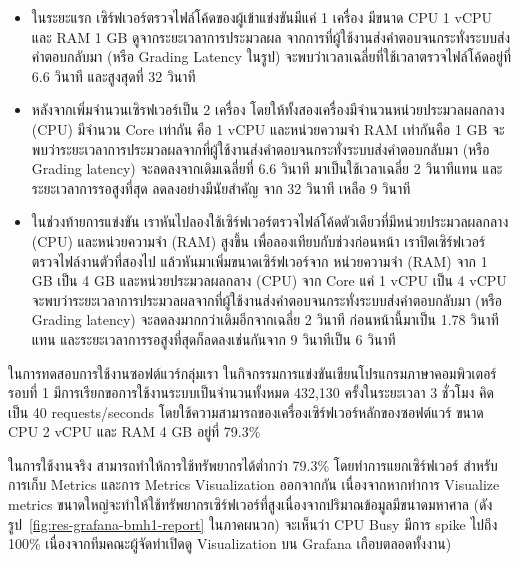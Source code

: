 \documentclass[12pt,one side,openright,a4paper]{cpe-thesis-th}
\newcommand{\thaijustify}[1]{%
  \par\hspace{30pt}\justifying
  #1
}
\begin{document}
        \begin{itemize}
            \item ในระยะแรก เซิร์ฟเวอร์ตรวจไฟล์โค้ดของผู้เข้าแข่งขันมีแค่ 1 เครื่อง มีขนาด CPU 1 vCPU และ RAM 1 GB ดูจากระยะเวลาการประมวลผล จากการที่ผู้ใช้งานส่งคำตอบจนกระทั่งระบบส่งคำตอบกลับมา (หรือ Grading Latency ในรูป) จะพบว่าเวลาเฉลี่ยที่ใช้เวลาตรวจไฟล์โค้ดอยู่ที่ 6.6 วินาที และสูงสุดที่ 32 วินาที
            \item หลังจากเพิ่มจำนวนเซิรฟเวอร์เป็น 2 เครื่อง โดยให้ทั้งสองเครื่องมีจำนวนหน่วยประมวลผลกลาง (CPU) มีจำนวน Core เท่ากัน คือ 1 vCPU และหน่วยความจำ RAM เท่ากันคือ 1 GB จะพบว่าระยะเวลาการประมวลผลจากที่ผู้ใช้งานส่งคำตอบจนกระทั่งระบบส่งคำตอบกลับมา (หรือ Grading latency) จะลดลงจากเดิมเฉลี่ยที่ 6.6 วินาที มาเป็นใช้เวลาเฉลี่ย 2 วินาทีแทน และระยะเวลาการรอสูงที่สุด ลดลงอย่างมีนัยสำคัญ จาก 32 วินาที เหลือ 9 วินาที
            \item ในช่วงท้ายการแข่งขัน เราหันไปลองใช้เซิร์ฟเวอร์ตรวจไฟล์โค้ดตัวเดียวที่มีหน่วยประมวลผลกลาง (CPU) และหน่วยความจำ (RAM) สูงขึ้น เพื่อลองเทียบกับช่วงก่อนหน้า เราปิดเซิร์ฟเวอร์ตรวจไฟล์งานตัวที่สองไป แล้วหันมาเพิ่มขนาดเซิร์ฟเวอร์จาก หน่วยความจำ (RAM) จาก 1 GB เป็น 4 GB และหน่วยประมวลผลกลาง (CPU) จาก Core แค่ 1 vCPU เป็น 4 vCPU จะพบว่าระยะเวลาการประมวลผลจากที่ผู้ใช้งานส่งคำตอบจนกระทั่งระบบส่งคำตอบกลับมา (หรือ Grading latency) จะลดลงมากกว่าเดิมอีกจากเฉลี่ย 2 วินาที ก่อนหน้านี้มาเป็น 1.78 วินาทีแทน และระยะเวลาการรอสูงที่สุดก็ลดลงเช่นกันจาก 9 วินาทีเป็น 6 วินาที
        \end{itemize}
        \thaijustify{
            ในการทดสอบการใช้งานซอฟต์แวร์กลุ่มเรา ในกิจกรรมการแข่งขันเขียนโปรแกรมภาษาคอมพิวเตอร์รอบที่ 1 มีการเรียกขอการใช้งานระบบเป็นจำนวนทั้งหมด 432,130 ครั้งในระยะเวลา 3 ชั่วโมง คิดเป็น 40 requests/seconds โดยใช้ความสามารถของเครื่องเซิร์ฟเวอร์หลักของซอฟต์แวร์ ขนาด CPU 2 vCPU และ RAM 4 GB อยู่ที่ 79.3\% 
        }
        \thaijustify{
            ในการใช้งานจริง สามารถทำให้การใช้ทรัพยากรได้ต่ำกว่า 79.3\% โดยทำการแยกเซิร์ฟเวอร์ สำหรับการเก็บ Metrics และการ Metrics Visualization ออกจากกัน เนื่องจากหากทำการ Visualize metrics ขนาดใหญ่จะทำให้ใช้ทรัพยากรเซิร์ฟเวอร์ที่สูงเนื่องจากปริมาณข้อมูลมีขนาดมหาศาล (ดังรูป~\ref{fig:res-grafana-bmh1-report} ในภาคผนวก) จะเห็นว่า CPU Busy มีการ spike ไปถึง 100\% เนื่องจากทีมคณะผู้จัดทำเปิดดู Visualization บน Grafana เกือบตลอดทั้งงาน)
        }
\end{document}
